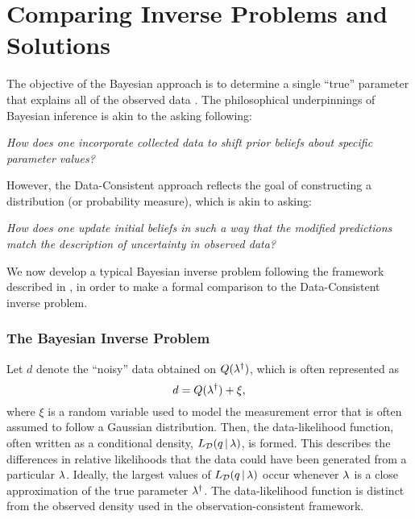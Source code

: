 \section{Comparing Inverse Problems and Solutions}\label{sec:compare}

The objective of the Bayesian approach is to determine a single ``true'' parameter that explains all of the observed data \cite{Smith, Concrete, Complete}.
The philosophical underpinnings of Bayesian inference is akin to the asking following:

\begin{center}
  \emph{How does one incorporate collected data to shift prior beliefs about specific parameter values?}
\end{center}

However, the Data-Consistent approach reflects the goal of constructing a distribution (or probability measure), which is akin to asking:

\begin{center}
  \emph{How does one update initial beliefs in such a way that the modified predictions match the description of uncertainty in observed data?}
\end{center}

We now develop a typical Bayesian inverse problem following the framework described in \cite{Stuart10, Smith}, in order to make a formal comparison to the Data-Consistent inverse problem.

\subsubsection{The Bayesian Inverse Problem}
Let $d$ denote the ``noisy'' data obtained on $Q(\lambda^\dagger)$, which is often represented as
\begin{equation*}
	d = Q(\lambda^\dagger) + \xi,
\end{equation*}
where $\xi$ is a random variable used to model the measurement error that is often assumed to follow a Gaussian distribution.
Then, the data-likelihood function, often written as a conditional density, $L_{\mathcal{D}}(q \, |\, \lambda)$, is formed.
This describes the differences in relative likelihoods that the data could have been generated from a particular $\lambda$.
Ideally, the largest values of $L_{\mathcal{D}}(q \, | \, \lambda)$ occur whenever $\lambda$ is a close approximation of the true parameter $\lambda^\dagger$.
The data-likelihood function is distinct from the observed density used in the observation-consistent framework.

